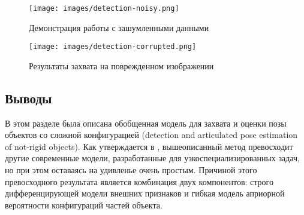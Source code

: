 \begin{figure}
  \centering
  \texttt{[image: images/detection-noisy.png]}
  \caption{Демонстрация работы с зашумленными данными\label{detection-noisy}}
\end{figure}

\begin{figure}
  \centering
  \texttt{[image: images/detection-corrupted.png]}
  \caption{Результаты захвата на поврежденном изображении\label{detection-corrupted}}
\end{figure}

\subsection{Выводы}
В этом разделе была описана обобщенная модель для захвата и оценки позы объектов со сложной конфигурацией (detection and articulated pose estimation of not-rigid objects). Как утверждается в \cite{andriluka09}, вышеописанный метод превосходит другие современные модели, разработанные для узкоспециализированных задач, но при этом оставаясь на удивленье очень простым. Причиной этого превосходного результата является комбинация двух компонентов: строго дифференцирующей модели внешних признаков и гибкая модель априорной вероятности конфигураций частей объекта.

\newpage
